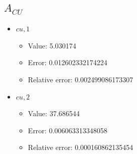 \documentclass{article}%
\begin{document}
\subsection{$A_{CU}$}%
\begin{itemize}%
	\item $\textit{cu},1$%
	\begin{itemize}%
		\item Value: 5.030174%
		\item Error: 0.012602332174224%
		\item Relative error: 0.002499086173307%
	\end{itemize}%
	\item $\textit{cu},2$%
	\begin{itemize}%
		\item Value: 37.686544%
		\item Error: 0.006063313348058%
		\item Relative error: 0.000160862135454%
	\end{itemize}%
\end{itemize}%
\end{document}
